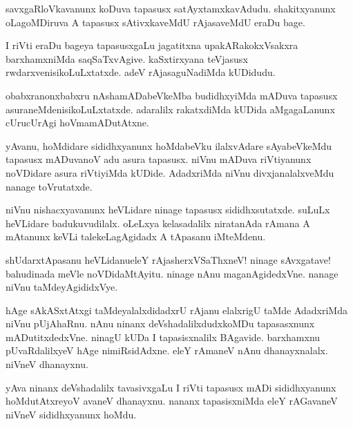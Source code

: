 \begin{mng}
savxgaRloVkavanunx koDuva tapasusx satAyxtamxkavAdudu. shakitxyanunx oLagoMDiruva A tapasusx sAtivxkaveMdU rAjasaveMdU eraDu bage.
\end{mng}

\begin{mng}
I riVti eraDu bageya tapasusxgaLu jagatitxna upakARakokxVsakxra barxhamxniMda saqSaTxvAgive. kaSxtirxyana teVjasusx rwdarxvenisikoLuLxtatxde. adeV rAjasaguNadiMda kUDidudu.
\end{mng}

\begin{mng}
obabxranonxbabxru nAshamADabeVkeMba budidhxyiMda mADuva tapasusx asuraneMdenisikoLuLxtatxde. adaralilx rakatxdiMda kUDida aMgagaLanunx cUrucUrAgi hoVmamADutAtxne.
\end{mng}

\begin{mng}
yAvanu, hoMdidare sididhxyanunx hoMdabeVku ilalxvAdare sAyabeVkeMdu tapasusx mADuvanoV adu asura tapasusx. niVnu mADuva riVtiyanunx noVDidare asura riVtiyiMda kUDide. AdadxriMda niVnu divxjanalalxveMdu nanage toVrutatxde.
\end{mng}

\begin{mng}
niVnu nishacxyavanunx heVLidare ninage tapasusx sididhxsutatxde. suLuLx heVLidare badukuvudilalx. oLeLxya kelasadalilx niratanAda rAmana A mAtanunx keVLi talekeLagAgidadx A tApasanu iMteMdenu.
\end{mng}

\begin{mng}
shUdarxtApasanu heVLidanu\mdash eleY rAjasherxVSaThxneV! ninage sAvxgatave! bahudinada meVle noVDidaMtAyitu. ninage nAnu maganAgidedxVne. nanage niVnu taMdeyAgididxVye.
\end{mng}

\begin{mng}
hAge sAkASxtAtxgi taMdeyalalxdidadxrU rAjanu elalxrigU taMde AdadxriMda niVnu pUjAhaRnu. nAnu ninanx deVshadalilxdudxkoMDu tapasasxnunx mADutitxdedxVne. ninagU kUDa I tapasisxnalilx BAgavide. barxhamxnu pUvaRdalilxyeV hAge nimiRsidAdxne. eleY rAmaneV nAnu dhanayxnalalx. niVneV dhanayxnu.
\end{mng}

\begin{mng}
yAva ninanx deVshadalilx tavasivxgaLu I riVti tapasusx mADi sididhxyanunx hoMdutAtxreyoV avaneV dhanayxnu. nananx tapasisxniMda eleY rAGavaneV niVneV sididhxyanunx hoMdu.
\end{mng}

